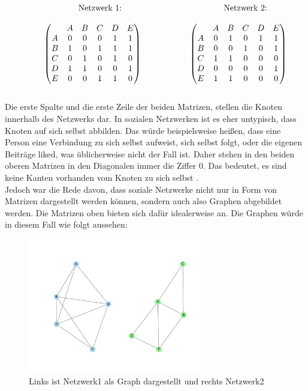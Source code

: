 \[
    \begin{array}{ccc} 
        \text{\hspace{-5.5cm}Netzwerk 1:} & \text{\hspace{-3cm}Netzwerk 2:} \\[\normalbaselineskip]
\begin{pmatrix}
& A & B & C & D & E\\
A & 0 & 0 & 0 & 1 & 1 \\
B & 1 & 0 & 1 & 1 & 1 \\
C & 0 & 1 & 0 & 1 & 0 \\
D & 1 & 1 & 0 & 0 & 1 \\
E & 0 & 0 & 1 & 1 & 0 \\
\end{pmatrix}
\hspace{2cm}
\begin{pmatrix}
& A & B & C & D & E\\
A & 0 & 1 & 0 & 1 & 1 \\
B & 0 & 0 & 1 & 0 & 1 \\
C & 1 & 1 & 0 & 0 & 0 \\
D & 0 & 0 & 0 & 0 & 1 \\
E & 1 & 1 & 0 & 0 & 0 \\
\end{pmatrix}
 \end{array} 
\]
\\
Die erste Spalte und die erste Zeile der beiden Matrizen, stellen die Knoten innerhalb des Netzwerks dar. In sozialen Netzwerken ist es eher untypisch, dass Knoten auf sich selbst abbilden. Das würde beispielsweise heißen, dass eine Person eine Verbindung zu sich selbst aufweist, sich selbst folgt, oder die eigenen Beiträge liked, was üblicherweise nicht der Fall ist. Daher stehen in den beiden oberen Matrizen in den Diagonalen immer die Ziffer $0$. Das bedeutet, es sind keine Kanten vorhanden vom Knoten zu sich selbst \cite{wasserman1994social}.\\
Jedoch war die Rede davon, dass soziale Netzwerke nicht nur in Form von Matrizen dargestellt werden können, sondern auch also Graphen abgebildet werden.
Die Matrizen oben bieten sich dafür idealerweise an. 
Die Graphen würde in diesem Fall wie folgt aussehen: 
\begin{figure}[h!]
    \centering
    \hspace*{-4cm}
    \includegraphics[width=0.7\textwidth]{Graphics/MatrixInNetwork.png}
    \caption{Links ist Netzwerk1 als Graph dargestellt und rechts Netzwerk2}\label{fig:MatrixInNetzwerk}
\end{figure}


